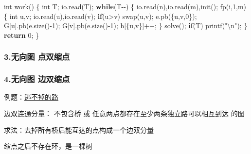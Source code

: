 \documentclass[
]{article}
\newenvironment{Shaded}{}{}
\newcommand{\ControlFlowTok}[1]{\textcolor[rgb]{0.00,0.44,0.13}{\textbf{#1}}}
\newcommand{\DataTypeTok}[1]{\textcolor[rgb]{0.56,0.13,0.00}{#1}}
\newcommand{\DecValTok}[1]{\textcolor[rgb]{0.25,0.63,0.44}{#1}}
\newcommand{\NormalTok}[1]{#1}
\newcommand{\SpecialCharTok}[1]{\textcolor[rgb]{0.25,0.44,0.63}{#1}}
\newcommand{\StringTok}[1]{\textcolor[rgb]{0.25,0.44,0.63}{#1}}
\begin{document}
\begin{Shaded}
\begin{Highlighting}[]
\DataTypeTok{int}\NormalTok{ work()}
\NormalTok{\{}
    \DataTypeTok{int}\NormalTok{ T;}
\NormalTok{    io.read(T);}
    \ControlFlowTok{while}\NormalTok{(T{-}{-})}
\NormalTok{    \{}
\NormalTok{        io.read(n),io.read(m),init();}
\NormalTok{        fp(i,}\DecValTok{1}\NormalTok{,m)}
\NormalTok{        \{}
            \DataTypeTok{int}\NormalTok{ u,v;}
\NormalTok{            io.read(u),io.read(v);}
            \ControlFlowTok{if}\NormalTok{(u\textgreater{}v) swap(u,v);}
\NormalTok{            e.pb(\{u,v,}\DecValTok{0}\NormalTok{\});}
\NormalTok{            G[u].pb(e.size(){-}}\DecValTok{1}\NormalTok{);}
\NormalTok{            G[v].pb(e.size(){-}}\DecValTok{1}\NormalTok{);}
\NormalTok{            h[\{u,v\}]++;}
\NormalTok{        \}}
\NormalTok{        solve();}
        \ControlFlowTok{if}\NormalTok{(T) printf(}\StringTok{"}\SpecialCharTok{\textbackslash{}n}\StringTok{"}\NormalTok{);}
\NormalTok{    \}}
    \ControlFlowTok{return} \DecValTok{0}\NormalTok{;}
\NormalTok{\}}
\end{Highlighting}
\end{Shaded}

\hypertarget{ux65e0ux5411ux56fe-ux70b9ux53ccux7f29ux70b9}{%
\subsubsection{3.无向图
点双缩点}\label{ux65e0ux5411ux56fe-ux70b9ux53ccux7f29ux70b9}}

\hypertarget{ux65e0ux5411ux56fe-ux8fb9ux53ccux7f29ux70b9}{%
\subsubsection{4.无向图
边双缩点}\label{ux65e0ux5411ux56fe-ux8fb9ux53ccux7f29ux70b9}}

例题：\href{https://www.acwing.com/problem/content/399/}{逃不掉的路}

边双连通分量： 不包含桥 或 任意两点都存在至少两条独立路可以相互到达 的图

求法：去掉所有桥后能互达的点构成一个边双分量

缩点之后不存在环，是一棵树
\end{document}
